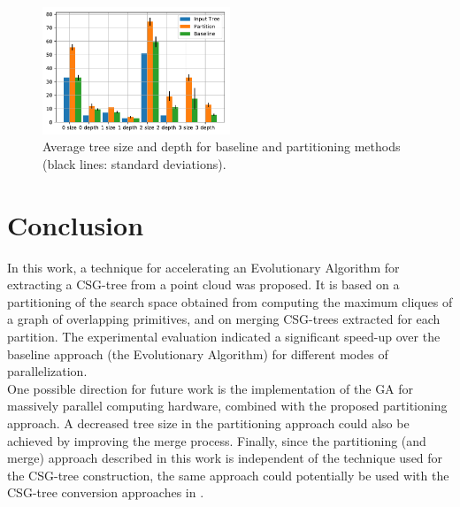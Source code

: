 \begin{figure}[htb]
	\centering
	\includegraphics[width=0.5\textwidth]{figures/g2.pdf}
	\caption{Average tree size and depth for baseline and partitioning methods (black lines: standard deviations).}
	\label{fig:graph2}
\end{figure}
\section{Conclusion}
\label{sec:conclusion}
In this work, a technique for accelerating an Evolutionary Algorithm for extracting 
a \ac{CSG}-tree from a point cloud was proposed. It is based on a partitioning of the search space obtained 
from computing the maximum cliques of a graph of overlapping primitives, and on merging \ac{CSG}-trees 
extracted for each partition. 
The experimental evaluation indicated a significant speed-up over the baseline approach (the Evolutionary Algorithm) for different modes of parallelization.
\\
One possible direction for future work is 
the implementation of the \ac{GA} for massively parallel computing hardware, combined with the proposed partitioning approach. 
A decreased tree size in the partitioning approach could also be achieved by improving the merge process.
Finally, since the partitioning (and merge) approach described in this work is independent of the technique used for the \ac{CSG}-tree construction, the same approach could potentially be used with the \ac{CSG}-tree conversion approaches in \cite{shapiro1991construction,buchele2004three}. 
